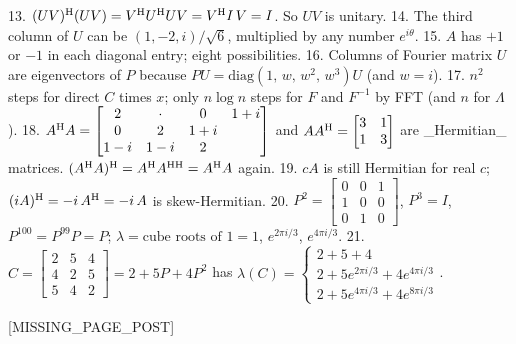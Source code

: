 13. \((UV)^{\rm H}(UV)=V^{\rm H}U^{\rm H}UV=V^{\rm H}I\,V=I\). So \(UV\) is unitary.
14. The third column of \(U\) can be \((1,-2,i)/\sqrt{6}\), multiplied by any number \(e^{i\theta}\).
15. \(A\) has \(+1\) or \(-1\) in each diagonal entry; eight possibilities.
16. Columns of Fourier matrix \(U\) are eigenvectors of \(P\) because \(PU=\text{diag}(1,\,w,\,w^{2},\,w^{3})U\) (and \(w=i\)).
17. \(n^{2}\) steps for direct \(C\) times \(x\); only \(n\log n\) steps for \(F\) and \(F^{-1}\) by FFT (and \(n\) for \(\Lambda\)).
18. \(A^{\rm H}A=\begin{bmatrix}2&\cdot&0&1+i\\ 0&2&1+i\\ 1-i&1-i&2\end{bmatrix}\) and \(AA^{\rm H}=\begin{bmatrix}3&1\\ 1&3\end{bmatrix}\) are _Hermitian_ matrices. \((A^{\rm H}A)^{\rm H}=A^{\rm H}A^{\rm HH}=A^{\rm H}A\) again.
19. \(cA\) is still Hermitian for real \(c\); \((iA)^{\rm H}=-i\,A^{\rm H}=-i\,A\) is skew-Hermitian.
20. \(P^{2}=\begin{bmatrix}0&0&1\\ 1&0&0\\ 0&1&0\end{bmatrix}\), \(P^{3}=I\), \(P^{100}=P^{99}P=P\); \(\lambda=\text{cube roots of }1=1\), \(e^{2\pi i/3}\), \(e^{4\pi i/3}\).
21. \(C=\begin{bmatrix}2&5&4\\ 4&2&5\\ 5&4&2\end{bmatrix}=2+5P+4P^{2}\) has \(\lambda(C)=\begin{cases}2+5+4\\ 2+5e^{2\pi i/3}+4e^{4\pi i/3}\\ 2+5e^{4\pi i/3}+4e^{8\pi i/3}\end{cases}\).

[MISSING_PAGE_POST]

 